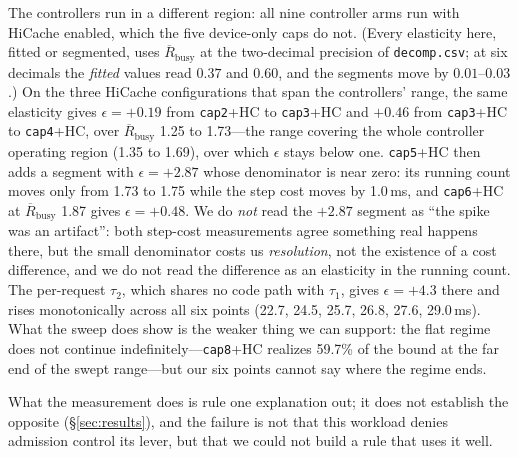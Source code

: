 The controllers run in a different region: all nine controller arms run with
HiCache enabled, which the five device-only caps do not. (Every elasticity
here, fitted or segmented, uses $\overline{R}_{\text{busy}}$ at the two-decimal
precision of \texttt{decomp.csv}; at six decimals the \emph{fitted} values read
$0.37$ and $0.60$, and the segments move by $0.01$--$0.03$.) On the three
HiCache configurations that span the controllers' range, the same elasticity
gives $\epsilon = +0.19$ from \texttt{cap2}+HC to \texttt{cap3}+HC and $+0.46$
from \texttt{cap3}+HC to \texttt{cap4}+HC, over $\overline{R}_{\text{busy}}$
1.25 to 1.73---the range covering the whole controller operating region (1.35 to
1.69), over which $\epsilon$ stays below one. \texttt{cap5}+HC then adds a
segment with $\epsilon = +2.87$ whose denominator is near zero: its running
count moves only from 1.73 to 1.75 while the step cost moves by 1.0\,ms, and
\texttt{cap6}+HC at $\overline{R}_{\text{busy}}$ 1.87 gives $\epsilon = +0.48$.
We do \emph{not} read the $+2.87$ segment as ``the spike was an artifact'': both
step-cost measurements agree something real happens there, but the small
denominator costs us \emph{resolution}, not the existence of a cost
difference, and we do not read the difference as an elasticity in the running
count. The per-request $\tau_2$, which shares no code path with $\tau_1$, gives
$\epsilon = +4.3$ there and rises monotonically across all six points (22.7, 24.5, 25.7, 26.8, 27.6,
29.0\,ms). What the sweep does show is the weaker thing we can support: the flat
regime does not continue indefinitely---\texttt{cap8}+HC realizes 59.7\% of the
bound at the far end of the swept range---but our six points cannot say where
the regime ends.

What the measurement does is rule
one explanation out; it does not establish the opposite
(\S\ref{sec:results}), and the failure is not that this workload denies
admission control its lever, but that we could not build a rule that uses it
well.

